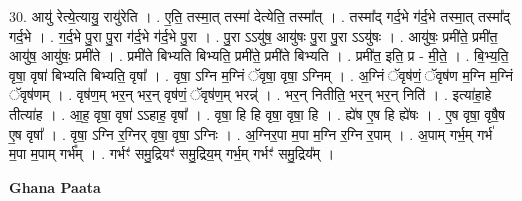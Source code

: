 \documentclass[17pt]{extarticle}
\begin{document}
30. आयु॑ रेत्ये॒त्यायु॒ रायु॑रेति । . ए॒ति॒ तस्मा॒त् तस्मा॑ देत्येति॒ तस्मा᳚त् । . तस्मा᳚द् गर्द॒भे ग॑र्द॒भे तस्मा॒त् तस्मा᳚द् गर्द॒भे । . ग॒र्द॒भे पु॒रा पु॒रा ग॑र्द॒भे ग॑र्द॒भे पु॒रा । . पु॒रा ऽऽयु॑ष॒ आयु॑षः पु॒रा पु॒रा ऽऽयु॑षः । . आयु॑षः॒ प्रमी॑ते॒ प्रमी॑त॒ आयु॑ष॒ आयु॑षः॒ प्रमी॑ते । . प्रमी॑ते बिभ्यति बिभ्यति॒ प्रमी॑ते॒ प्रमी॑ते बिभ्यति । . प्रमी॑त॒ इति॒ प्र - मी॒ते॒ । . बि॒भ्य॒ति॒ वृषा॒ वृषा॑ बिभ्यति बिभ्यति॒ वृषा᳚ । . वृषा॒ ऽग्नि म॒ग्निं ॅवृषा॒ वृषा॒ ऽग्निम् । . अ॒ग्निं ॅवृष॑णं॒ ॅवृष॑ण म॒ग्नि म॒ग्निं ॅवृष॑णम् । . वृष॑ण॒म् भर॒न् भर॒न् वृष॑णं॒ ॅवृष॑ण॒म् भरन्न्॑ । . भर॒न् नितीति॒ भर॒न् भर॒न् निति॑ । . इत्या॑हा॒हे तीत्या॑ह । . आ॒ह॒ वृषा॒ वृषा॑ ऽऽहाह॒ वृषा᳚ । . वृषा॒ हि हि वृषा॒ वृषा॒ हि । . ह्ये॑ष ए॒ष हि ह्ये॑षः । . ए॒ष वृषा॒ वृषै॒ष ए॒ष वृषा᳚ । . वृषा॒ ऽग्नि र॒ग्निर् वृषा॒ वृषा॒ ऽग्निः । . अ॒ग्निर॒पा म॒पा म॒ग्नि र॒ग्नि र॒पाम् । . अ॒पाम् गर्भ॒म् गर्भ॑ म॒पा म॒पाम् गर्भ᳚म् । . गर्भꣳ॑ समु॒द्रियꣳ॑ समु॒द्रिय॒म् गर्भ॒म् गर्भꣳ॑ समु॒द्रिय᳚म् । \newline

\textbf{Ghana Paata } \newline
\end{document}
